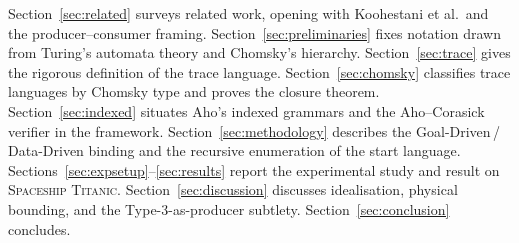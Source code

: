 Section~\ref{sec:related} surveys related work, opening with
Koohestani et al.\ and the producer--consumer framing.
Section~\ref{sec:preliminaries} fixes notation drawn from
Turing's automata theory and Chomsky's hierarchy.
Section~\ref{sec:trace} gives the rigorous definition of the
trace language.  Section~\ref{sec:chomsky} classifies trace
languages by Chomsky type and proves the closure theorem.
Section~\ref{sec:indexed} situates Aho's indexed grammars and
the Aho--Corasick verifier in the framework.
Section~\ref{sec:methodology} describes the Goal-Driven\,/\,
Data-Driven binding and the recursive enumeration of the start
language.  Sections~\ref{sec:expsetup}--\ref{sec:results} report
the experimental study and result on \textsc{Spaceship Titanic}.
Section~\ref{sec:discussion} discusses idealisation, physical
bounding, and the Type-3-as-producer subtlety.
Section~\ref{sec:conclusion} concludes.

